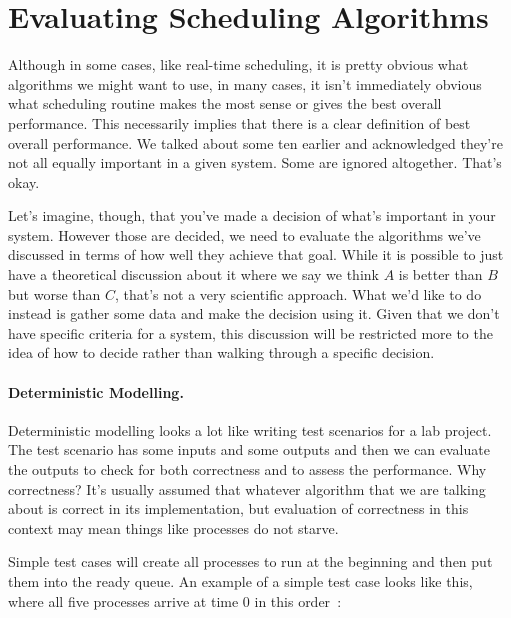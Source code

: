 




\section*{Evaluating Scheduling Algorithms}

Although in some cases, like real-time scheduling, it is pretty obvious what algorithms we might want to use, in many cases, it isn't immediately obvious what scheduling routine makes the most sense or gives the best overall performance. This necessarily implies that there is a clear definition of best overall performance. We talked about some ten earlier and acknowledged they're not all equally important in a given system. Some are ignored altogether. That's okay.

Let's imagine, though, that you've made a decision of what's important in your system. However those are decided, we need to evaluate the algorithms we've discussed in terms of how well they achieve that goal. While it is possible to just have a theoretical discussion about it where we say we think $A$ is better than $B$ but worse than $C$, that's not a very scientific approach. What we'd like to do instead is gather some data and make the decision using it. Given that we don't have specific criteria for a system, this discussion will be restricted more to the idea of how to decide rather than walking through a specific decision. 

\paragraph{Deterministic Modelling.}

Deterministic modelling looks a lot like writing test scenarios for a lab project. The test scenario has some inputs and some outputs and then we can evaluate the outputs to check for both correctness and to assess the performance.  Why correctness? It's usually assumed that whatever algorithm that we are talking about is correct in its implementation, but evaluation of correctness in this context may mean things like processes do not starve.

Simple test cases will create all processes to run at the beginning and then put them into the ready queue. An example of a simple test case looks like this, where all five processes arrive at time 0 in this order~\cite{osc}:

